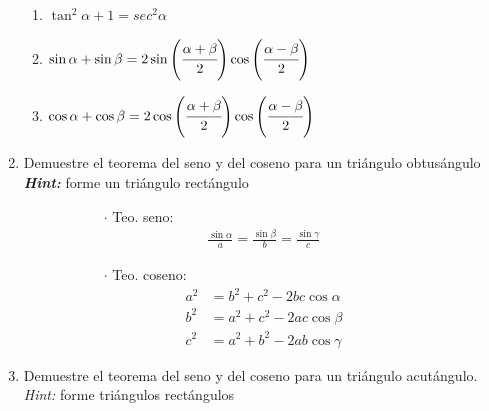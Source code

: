 \documentclass[letterpaper,11pt]{article}
\begin{document}
\begin{enumerate}
{\begin{multicols}{2}
\begin{enumerate}
        \item $\tan^2\alpha + 1 = sec^2\alpha$
        
        \columnbreak
        
        \item $\sin\alpha + \sin\beta = 2\sin{\left(\cfrac{\alpha+\beta}{2}\right)}\cos{\left(\cfrac{\alpha-\beta}{2}\right)}$
        
        \item $\cos\alpha+\cos\beta = 2\cos{\left(\cfrac{\alpha+\beta}{2}\right)}\cos{\left(\cfrac{\alpha-\beta}{2}\right)}$
    \end{enumerate}
    \end{multicols}
    }

\item Demuestre el teorema del seno y del coseno para un triángulo obtusángulo\\
\textbf{\textit{Hint:}} forme un triángulo rectángulo

\begin{figure}[H]
    \centering
    \begin{subfigure}[t]{0.6\textwidth}
        \centering
        
    \end{subfigure}
    \hspace{1em}
    \begin{subfigure}[b]{0.30\textwidth}
        $\cdot$ Teo. seno:
        \begin{align*}
            \frac{\sin{\alpha}}{a}=\frac{\sin{\beta}}{b}=\frac{\sin{\gamma}}{c}
        \end{align*}
        
        $\cdot$ Teo. coseno:
        \begin{align*}
            a^2 &= b^2 + c^2 -2bc\cos{\alpha}\\
            b^2 &= a^2 + c^2 -2ac\cos{\beta}\\
            c^2 &= a^2 + b^2 -2ab\cos{\gamma}
        \end{align*}
    \end{subfigure}
\end{figure}

\item Demuestre el teorema del seno y del coseno para un triángulo acutángulo.\\
\textit{Hint:} forme triángulos rectángulos


\end{enumerate}
\end{document}
